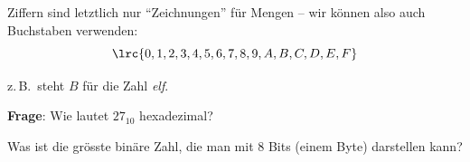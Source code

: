 \begin{frame}
Ziffern sind letztlich nur \enquote{Zeichnungen} für Mengen -- wir können also auch Buchstaben verwenden:
$$\lrc{0,1,2,3,4,5,6,7,8,9,A,B,C,D,E,F}$$
\begin{center}
z.\,B.\ steht $B$ für die Zahl \textit{elf}.
\end{center}
\vspace{3mm}
\begin{center}
\textbf{Frage}: Wie lautet $27_{10}$ hexadezimal?
\end{center}
\end{frame}

\begin{frame}
\begin{center}
Was ist die grösste binäre Zahl, die man mit 8 Bits (einem Byte) darstellen kann?
\end{center}
\end{frame}


